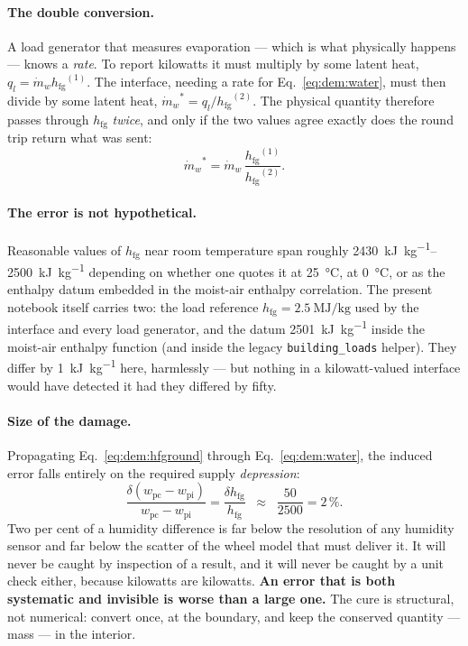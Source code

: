 \documentclass[11pt]{article}
\providecommand{\celsius}{\degreeCelsius}
\newcommand{\mdw}{\ensuremath{\dot m_{w}}}
\newcommand{\hfg}{\ensuremath{h_{\mathrm{fg}}}}
\newcommand{\ql}{\ensuremath{q_{l}}}
\begin{document}
\paragraph{The double conversion.} A load generator that measures evaporation ---
which is what physically happens --- knows a \emph{rate}. To report kilowatts it
must multiply by some latent heat, $\ql=\mdw\hfg^{(1)}$. The interface, needing a
rate for Eq.~\eqref{eq:dem:water}, must then divide by some latent heat,
$\mdw^{\ast}=\ql/\hfg^{(2)}$. The physical quantity therefore passes through
$\hfg$ \emph{twice}, and only if the two values agree exactly does the round trip
return what was sent:
\begin{equation}
\mdw^{\ast}=\mdw\,\frac{\hfg^{(1)}}{\hfg^{(2)}} .
\label{eq:dem:hfground}
\end{equation}

\paragraph{The error is not hypothetical.} Reasonable values of $\hfg$ near room
temperature span roughly \SIrange{2430}{2500}{\kilo\joule\per\kilogram} depending
on whether one quotes it at \SI{25}{\celsius}, at \SI{0}{\celsius}, or as the
enthalpy datum embedded in the moist-air enthalpy correlation. The present
notebook itself carries two: the load reference
$\hfg=\SI{2.5}{\mega\joule\per\kilogram}$ used by the interface and every load
generator, and the datum \SI{2501}{\kilo\joule\per\kilogram} inside the moist-air
enthalpy function (and inside the legacy \verb|building_loads| helper). They
differ by \SI{1}{\kilo\joule\per\kilogram} here, harmlessly --- but nothing in a
kilowatt-valued interface would have detected it had they differed by fifty.

\paragraph{Size of the damage.} Propagating Eq.~\eqref{eq:dem:hfground} through
Eq.~\eqref{eq:dem:water}, the induced error falls entirely on the required supply
\emph{depression}:
\begin{equation}
\frac{\delta\!\left(w_{\mathrm{pc}}-w_{\mathrm{pi}}\right)}
     {w_{\mathrm{pc}}-w_{\mathrm{pi}}}
=\frac{\delta \hfg}{\hfg}
\;\;\approx\;\;\frac{50}{2500}=2\,\% .
\label{eq:dem:hfgerr}
\end{equation}
Two per cent of a humidity difference is far below the resolution of any humidity
sensor and far below the scatter of the wheel model that must deliver it. It will
never be caught by inspection of a result, and it will never be caught by a unit
check either, because kilowatts are kilowatts. \textbf{An error that is both
systematic and invisible is worse than a large one.} The cure is structural, not
numerical: convert once, at the boundary, and keep the conserved quantity ---
mass --- in the interior.
\end{document}
